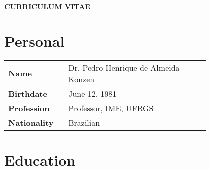 \documentclass[a4paper,12pt]{article}
\begin{document}
\begin{center}
  {\bf\Large CURRICULUM VITAE}
\end{center}

\section{Personal}

\begin{longtable}[H]{p{0.2\linewidth}p{0.6\linewidth}}
  {\bf Name} & Dr. Pedro Henrique de Almeida Konzen\\
  {\bf Birthdate} & June 12, 1981\\
  {\bf Profession} & Professor, IME, UFRGS\\
  {\bf Nationality} & Brazilian
\end{longtable}

\section{Education}
\end{document}
